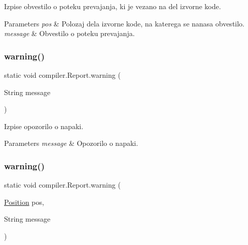 Izpise obvestilo o poteku prevajanja, ki je vezano na del izvorne kode.


\begin{DoxyParams}{Parameters}
{\em pos} & Polozaj dela izvorne kode, na katerega se nanasa obvestilo. \\
\hline
{\em message} & Obvestilo o poteku prevajanja. \\
\hline
\end{DoxyParams}
\mbox{\label{classcompiler_1_1_report_aaaf44479dfb4447701bc328f1aa4b9e6}} 
\subsubsection{\texorpdfstring{warning()}{warning()}\hspace{0.1cm}{\footnotesize\ttfamily [1/3]}}
{\footnotesize\ttfamily static void compiler.\+Report.\+warning (\begin{DoxyParamCaption}\item[{String}]{message }\end{DoxyParamCaption})\hspace{0.3cm}{\ttfamily [static]}}

Izpise opozorilo o napaki.


\begin{DoxyParams}{Parameters}
{\em message} & Opozorilo o napaki. \\
\hline
\end{DoxyParams}
\mbox{\label{classcompiler_1_1_report_a2054144e10ddb3a152b942db6b6d6f23}} 
\subsubsection{\texorpdfstring{warning()}{warning()}\hspace{0.1cm}{\footnotesize\ttfamily [2/3]}}
{\footnotesize\ttfamily static void compiler.\+Report.\+warning (\begin{DoxyParamCaption}\item[{\hyperlink{classcompiler_1_1_position}{Position}}]{pos,  }\item[{String}]{message }\end{DoxyParamCaption})\hspace{0.3cm}{\ttfamily [static]}}

